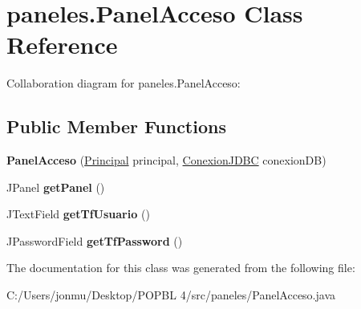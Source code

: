 \hypertarget{classpaneles_1_1_panel_acceso}{}\section{paneles.\+Panel\+Acceso Class Reference}
\label{classpaneles_1_1_panel_acceso}


Collaboration diagram for paneles.\+Panel\+Acceso\+:
\subsection*{Public Member Functions}
\begin{DoxyCompactItemize}
\item 
\mbox{\label{classpaneles_1_1_panel_acceso_ab19590219a09f461529209808b8dbd25}} 
{\bfseries Panel\+Acceso} (\mbox{\hyperlink{classvistas_1_1_principal}{Principal}} principal, \mbox{\hyperlink{classmysql_1_1_conexion_j_d_b_c}{Conexion\+J\+D\+BC}} conexion\+DB)
\item 
\mbox{\label{classpaneles_1_1_panel_acceso_ac978a2c0e1aef22aa66b19abe354b02b}} 
J\+Panel {\bfseries get\+Panel} ()
\item 
\mbox{\label{classpaneles_1_1_panel_acceso_a2e9e57df2c86935dcee9830931a7d3ec}} 
J\+Text\+Field {\bfseries get\+Tf\+Usuario} ()
\item 
\mbox{\label{classpaneles_1_1_panel_acceso_acff0ecd448fa0435276817069e088492}} 
J\+Password\+Field {\bfseries get\+Tf\+Password} ()
\end{DoxyCompactItemize}


The documentation for this class was generated from the following file\+:\begin{DoxyCompactItemize}
\item 
C\+:/\+Users/jonmu/\+Desktop/\+P\+O\+P\+B\+L 4/src/paneles/Panel\+Acceso.\+java\end{DoxyCompactItemize}
